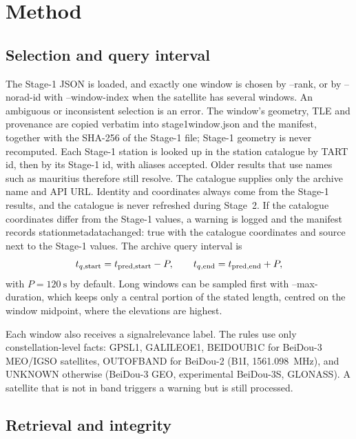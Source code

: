 \documentclass[11pt,a4paper]{article}
\newcommand{\code}[1]{{\ttfamily\def\_{\textunderscore\allowbreak}#1}}
\begin{document}
\section{Method}

\subsection{Selection and query interval}
\label{sec:stage2method}

The Stage-1 JSON is loaded, and exactly one window is chosen by
\code{--rank}, or by \code{--norad-id} with \code{--window-index} when the
satellite has several windows. An ambiguous or inconsistent selection is an
error. The window's geometry, TLE and provenance are copied verbatim into
\code{stage1\_window.json} and the manifest, together with the SHA-256 of
the Stage-1 file; Stage-1 geometry is never recomputed. Each Stage-1
station is looked up in the station catalogue by TART id, then by its
Stage-1 id, with aliases accepted. Older results that use names such as
\code{mauritius} therefore still resolve. The catalogue supplies only the
archive name and API URL. Identity and coordinates always come from the
Stage-1 results, and the catalogue is never refreshed during Stage~2. If
the catalogue coordinates differ from the Stage-1 values, a warning is
logged and the manifest records \code{station\_metadata\_changed: true}
with the catalogue coordinates and source next to the Stage-1 values. The
archive query interval is
\begin{equation}
t_{q,\rm start}=t_{\rm pred,start}-P,\qquad t_{q,\rm end}=t_{\rm pred,end}+P,
\end{equation}
with $P=\SI{120}{\second}$ by default. Long windows can be sampled first
with \code{--max-duration}, which keeps only a central portion of the stated
length, centred on the window midpoint, where the elevations are highest.

Each window also receives a \code{signal\_relevance} label. The rules use
only constellation-level facts: \code{GPS\_L1}, \code{GALILEO\_E1},
\code{BEIDOU\_B1C} for BeiDou-3 MEO/IGSO satellites, \code{OUT\_OF\_BAND}
for BeiDou-2 (B1I, \SI{1561.098}{\mega\hertz}), and \code{UNKNOWN}
otherwise (BeiDou-3 GEO, experimental BeiDou-3S, GLONASS). A satellite that
is not in band triggers a warning but is still processed.

\subsection{Retrieval and integrity}
\end{document}
